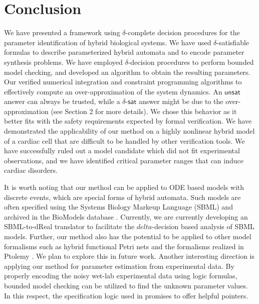\section{Conclusion}

We have presented a framework using $\delta$-complete decision procedures for the parameter identification 
of hybrid biological systems. We have used $\delta$-satisfiable formulas to describe parameterized hybrid automata 
and to encode parameter synthesis problems. We have employed $\delta$-decision procedures to perform bounded model 
checking, and developed an algorithm to obtain the resulting parameters. 
Our verified numerical integration and constraint programming algorithms to effectively compute an over-approximation of the system dynamics. An  $\mathsf{unsat}$ answer can always be trusted, while a $\delta$-$\mathsf{sat}$ answer might be due to the over-approximation (see Section 2 for more details). We chose this behavior as it better fits with the safety requirements expected by formal verification.
We have demonstrated the applicability of our method on a highly nonlinear hybrid model of a cardiac cell that are difficult to
be handled by other verification tools. We have successfully ruled out a model candidate which did not fit experimental observations, and we have identified critical parameter ranges that can induce cardiac disorders.

It is worth noting that our method can be applied to ODE based models with discrete events, which are special forms of hybrid automata. Such models are often specified using the Systems Biology Markeup Language (SBML) %
and archived in the BioModels database \cite{biomodels}. Currently, we are currently developing an SBML-to-dReal translator to facilitate the $delta$-decision based analysis of SBML models. 
Further, our method also has the potential to be applied to other model formalisms such as hybrid functional Petri nets \cite{hfpn} and the formalisms realized in Ptolemy \cite{ptolemy}. We plan to explore this in future work.
Another interesting direction is applying our method for parameter estimation from experimental data. By properly encoding the noisy wet-lab experimental data using logic formulas, bounded model checking can be utilized to find the unknown parameter values.
In this respect, the specification logic used in \cite{liu13} promises to offer helpful pointers.




